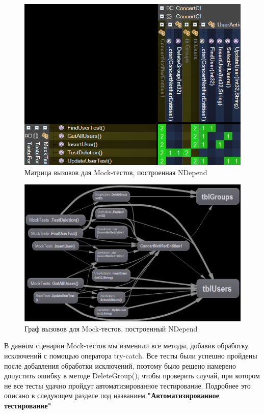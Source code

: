 \begin{figure}
	\centering
	\includegraphics[scale=0.7]{DependencyMatrixSmall.png}
	\caption{Матрица вызовов для Mock-тестов, построенная NDepend}
	\label{image:simple-dep}
\end{figure}


\begin{figure}
	\centering
	\includegraphics[scale=0.7]{DependencyGraphSnapshotSimple.png}
	\caption{Граф вызовов для Mock-тестов, построенный NDepend} 
	\label{image:simple-graph}
\end{figure}

\newpage
В данном сценарии Mock-тестов мы изменили все методы, добавив обработку исключений с помощью оператора try-catch. Все тесты были успешно пройдены после добавления обработки исключений, поэтому было решено намерено допустить ошибку в методе DeleteGroup(), чтобы проверить случай, при котором не все тесты удачно пройдут автоматизированное тестирование. Подробнее это описано в следующем разделе под названием \textbf{ "Автоматизированное тестирование"}


